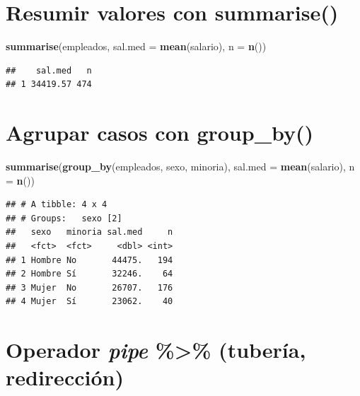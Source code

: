 \documentclass[]{book}
\newenvironment{Shaded}{\begin{snugshade}}{\end{snugshade}}
\newcommand{\DataTypeTok}[1]{\textcolor[rgb]{0.13,0.29,0.53}{#1}}
\newcommand{\KeywordTok}[1]{\textcolor[rgb]{0.13,0.29,0.53}{\textbf{#1}}}
\newcommand{\NormalTok}[1]{#1}
\begin{document}
\hypertarget{resumir-valores-con-summarise}{%
\section{\texorpdfstring{Resumir valores con \textbf{summarise()}}{Resumir valores con summarise()}}\label{resumir-valores-con-summarise}}

\begin{Shaded}
\begin{Highlighting}[]
\KeywordTok{summarise}\NormalTok{(empleados, }\DataTypeTok{sal.med =} \KeywordTok{mean}\NormalTok{(salario), }\DataTypeTok{n =} \KeywordTok{n}\NormalTok{())}
\end{Highlighting}
\end{Shaded}

\begin{verbatim}
##    sal.med   n
## 1 34419.57 474
\end{verbatim}

\hypertarget{agrupar-casos-con-group_by}{%
\section{\texorpdfstring{Agrupar casos con \textbf{group\_by()}}{Agrupar casos con group\_by()}}\label{agrupar-casos-con-group_by}}

\begin{Shaded}
\begin{Highlighting}[]
\KeywordTok{summarise}\NormalTok{(}\KeywordTok{group_by}\NormalTok{(empleados, sexo, minoria), }\DataTypeTok{sal.med =} \KeywordTok{mean}\NormalTok{(salario), }\DataTypeTok{n =} \KeywordTok{n}\NormalTok{())}
\end{Highlighting}
\end{Shaded}

\begin{verbatim}
## # A tibble: 4 x 4
## # Groups:   sexo [2]
##   sexo   minoria sal.med     n
##   <fct>  <fct>     <dbl> <int>
## 1 Hombre No       44475.   194
## 2 Hombre Sí       32246.    64
## 3 Mujer  No       26707.   176
## 4 Mujer  Sí       23062.    40
\end{verbatim}

\hypertarget{operador-pipe-tuberia-redireccion}{%
\section{\texorpdfstring{Operador \emph{pipe} \textbf{\%\textgreater{}\%} (tubería, redirección)}{Operador pipe \%\textgreater{}\% (tubería, redirección)}}\label{operador-pipe-tuberia-redireccion}}
\end{document}
